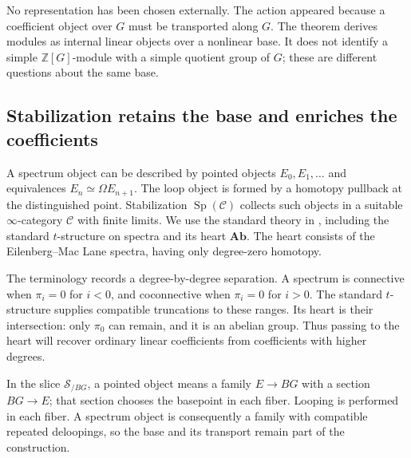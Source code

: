 No representation has been chosen externally.  The action appeared
because a coefficient object over $G$ must be transported along $G$.
The theorem derives modules as internal linear objects over a nonlinear
base.  It does not identify a simple $\mathbb Z[G]$-module with a simple
quotient group of $G$; these are different questions about the same base.

\subsection{Stabilization retains the base and enriches the coefficients}

A spectrum object can be described by pointed objects $E_0,E_1,\ldots$
and equivalences $E_n\simeq\Omega E_{n+1}$.  The loop object is formed by
a homotopy pullback at the distinguished point.  Stabilization
$\operatorname{Sp}(\mathcal C)$ collects such objects in a suitable
$\infty$-category $\mathcal C$ with finite limits.  We use the standard
theory in \cite[\S\S1.4.2--1.4.3]{HA}, including the standard $t$-structure on
spectra and its heart $\mathbf{Ab}$.  The heart consists of the
Eilenberg--Mac Lane spectra, having only degree-zero homotopy.

The terminology records a degree-by-degree separation. A spectrum is
connective when $\pi_i=0$ for $i<0$, and coconnective when $\pi_i=0$
for $i>0$. The standard $t$-structure supplies compatible truncations
to these ranges. Its heart is their intersection: only $\pi_0$ can
remain, and it is an abelian group. Thus passing to the heart will
recover ordinary linear coefficients from coefficients with higher degrees.

In the slice $\mathcal S_{/BG}$, a pointed object means a family
$E\to BG$ with a section $BG\to E$; that section chooses the basepoint
in each fiber. Looping is performed in each fiber. A spectrum object
is consequently a family with compatible repeated deloopings, so the
base and its transport remain part of the construction.

